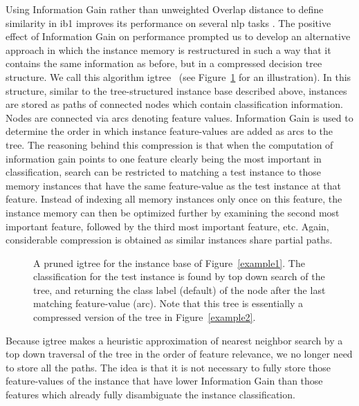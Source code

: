\documentclass{report}
\begin{document}
Using Information Gain rather than unweighted Overlap distance to
define similarity in {\sc ib1} improves its performance on several
{\sc nlp} tasks \cite{Daelemans+92b,VandenBosch+93,VandenBosch97}.
The positive effect of Information Gain on performance prompted us to
develop an alternative approach in which the instance memory is
restructured in such a way that it contains the same information as
before, but in a compressed decision tree structure. We call this
algorithm {\sc igtree}~\cite{Daelemans+97} (see Figure~\ref{example3}
for an illustration). In this structure, similar to the
tree-structured instance base described above, instances are stored as
paths of connected nodes which contain classification
information. Nodes are connected via arcs denoting feature
values. Information Gain is used to determine the order in which
instance feature-values are added as arcs to the tree. The reasoning
behind this compression is that when the computation of information
gain points to one feature clearly being the most important in
classification, search can be restricted to matching a test instance
to those memory instances that have the same feature-value as the test
instance at that feature. Instead of indexing all memory instances
only once on this feature, the instance memory can then be optimized
further by examining the second most important feature, followed by
the third most important feature, etc.  Again, considerable
compression is obtained as similar instances share partial paths.

\begin{figure}[htb]
        \begin{center}
                \leavevmode
                \epsfxsize=10cm
                \caption{A pruned {\sc igtree} for the instance base
                of Figure~\ref{example1}. The classification for
                the test instance is found by top down search of the
                tree, and returning the class label (default) of the
                node after the last matching feature-value (arc). Note
                that this tree is essentially a compressed version of
                the tree in Figure~\ref{example2}.
                }
                \label{example3}
        \end{center}
\end{figure}

Because {\sc igtree} makes a heuristic approximation of nearest
neighbor search by a top down traversal of the tree in the order of
feature relevance, we no longer need to store all the paths. The idea
is that it is not necessary to fully store those feature-values of the
instance that have lower Information Gain than those features which
already fully disambiguate the instance classification.
\end{document}
